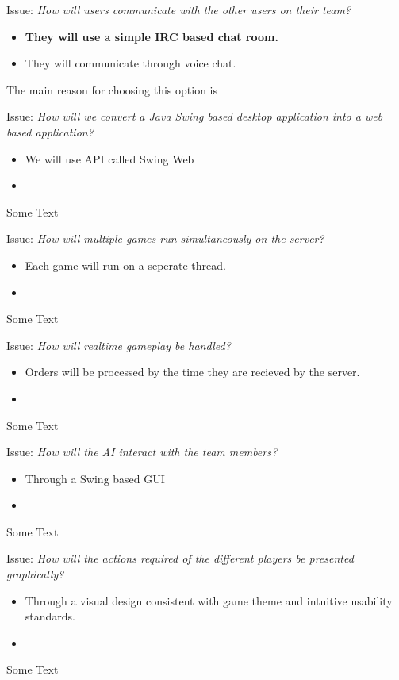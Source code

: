 Issue: \textit{How will users communicate with the other users on their team?}

  \begin{itemize}
    \item \textbf{They will use a simple IRC based chat room.}
    \item They will communicate through voice chat.
  \end{itemize}

The main reason for choosing this option is 

Issue: \textit{How will we convert a Java Swing based desktop application into a web based application?}

  \begin{itemize}
    \item We will use API called Swing Web
    \item 
  \end{itemize}

Some Text

Issue: \textit{How will multiple games run simultaneously on the server?}

  \begin{itemize}
    \item Each game will run on a seperate thread.
    \item 
  \end{itemize}

Some Text

Issue: \textit{How will realtime gameplay be handled?}

  \begin{itemize}
    \item Orders will be processed by the time they are recieved by the server.
    \item 
  \end{itemize}

Some Text

Issue: \textit{How will the AI interact with the team members?}

  \begin{itemize}
    \item Through a Swing based GUI
    \item 
  \end{itemize}

Some Text

Issue: \textit{How will the actions required of the different players be presented graphically?}

  \begin{itemize}
    \item Through a visual design consistent with game theme and intuitive usability standards.
    \item 
  \end{itemize}

Some Text
